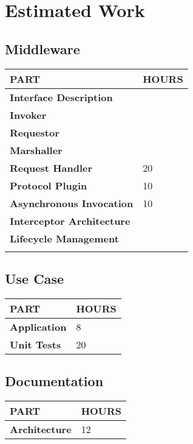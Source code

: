 \documentclass[a4paper]{article}
\begin{document}
\pagestyle{empty}
\section*{Estimated Work}
\vspace{0.5cm}
\subsection*{Middleware}

\begin{small}
\begin{tabular}{| p{4cm} | p{9cm} |}\hline
\textbf{PART} & \textbf{HOURS}\\\hline\hline
\textbf{Interface Description} & \\\hline
\textbf{Invoker} & \\\hline
\textbf{Requestor} & \\\hline
\textbf{Marshaller} & \\\hline
\textbf{Request Handler} & 20\\\hline
\textbf{Protocol Plugin} & 10\\\hline
\textbf{Asynchronous Invocation} & 10\\\hline
\textbf{Interceptor Architecture} & \\\hline
\textbf{Lifecycle Management} & \\\hline\hline
 & \\\hline
\end{tabular}
\end{small}

\vspace{1cm}

\subsection*{Use Case}

\begin{small}
\begin{tabular}{| p{4cm} | p{9cm} |}\hline
\textbf{PART} & \textbf{HOURS}\\\hline\hline
\textbf{Application} & 8\\\hline
\textbf{Unit Tests} & 20\\\hline
\end{tabular}
\end{small}


\vspace{1cm}

\subsection*{Documentation}

\begin{small}
\begin{tabular}{| p{4cm} | p{9cm} |}\hline
\textbf{PART} & \textbf{HOURS}\\\hline\hline
\textbf{Architecture} & 12\\\hline
\end{tabular}
\end{small}
\end{document}
